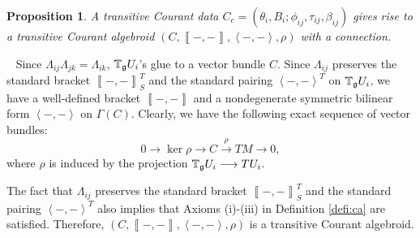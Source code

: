 \documentclass[letterpaper,10pt, oneside]{article} %
\newtheorem{pro}[thm]{Proposition}
\newcommand {\cc}[1]{{\marginpar{*}\scriptsize\textcolor{red}{cc: #1}}}
\newcommand{\calc}[1]{} %
\newcommand{\tagui}{{\mathbb{T}_\g U_i}}
\newcommand{\tagof}[1]{\mathbb{T}_\g {#1}}
\newcommand{\pf}{\noindent{\bf Proof.}\ }
\newcommand{\huaG}{\mathcal{G}}
\newcommand{\pair}[1]{\left\langle #1\right\rangle}
\newcommand{\Courant}[1]{\left\llbracket  #1\right\rrbracket }
\newcommand{\pr}{\mathrm{pr}}
\begin{document}

\begin{pro}\label{thm:tco}\label{pro:tco}
A transitive Courant data  $C_c=(\theta_i, B_i;\phi_{ij},\tau_{ij},\beta_{ij})$ gives rise to a  transitive Courant algebroid $(C,\Courant{-,-},\pair{-,-},\rho)$ with a connection.%
\end{pro}
\pf
Since $\Lambda_{ij}\Lambda_{jk}=\Lambda_{ik}$, $\tagof{U_i}$'s glue to  a vector bundle $C$. Since $\Lambda_{ij}$ preserves the standard bracket $\Courant{-,-}^T_S$ and the standard pairing $\pair{-,-}^T$ on $\tagof{U_i}$, we have a well-defined bracket $\Courant{-,-}$ and a  nondegenerate symmetric bilinear form $\pair{-,-}$ on $\Gamma(C)$. Clearly, we have the following exact sequence of vector bundles:
$$
0\stackrel{}{\longrightarrow}\ker\rho\stackrel{}{\longrightarrow}C\stackrel{\rho}{\longrightarrow}TM\stackrel{}{\longrightarrow}0,
$$
where $\rho$ is induced by the projection $\tagof{U_i}\longrightarrow TU_i$.
\calc{ $$
C=\coprod TU_i\oplus(U_i\times\g)\oplus T^*U_i/\thicksim,
$$
where the equivalence relation $\thicksim$ is given by
$$
X+a+\xi\thicksim Y+b+\eta \Longleftrightarrow \left(\begin{array}{c}Y\\b\\\eta\end{array}\right)=\Lambda_{ij}\left(\begin{array}{c}X\\a\\\xi\end{array}\right),
$$
for all $X+a+\xi\in \tagof{U_j},~Y+b+\eta\in \tagof{U_i}$.}


The fact that $\Lambda_{ij}$ preserves the standard bracket $\Courant{-,-}^T_S$ and the standard pairing $\pair{-,-}^T$ also implies that Axioms (i)-(iii) in Definition \ref{defi:ca} are satisfied. Therefore, $(C,\Courant{-,-},\pair{-,-},\rho)$ is a transitive Courant algebroid.
\end{document}
